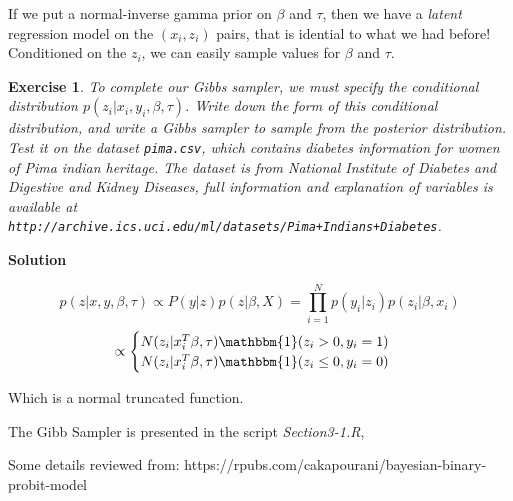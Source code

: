 \documentclass[twoside]{article}
\newcounter{lecnum}
\newtheorem{exercise}{Exercise}[lecnum]
\begin{document}
If we put a normal-inverse gamma prior on $\beta$ and $\tau$, then we have a \textit{latent} regression model on the $(x_i,z_i)$ pairs, that is idential to what we had before! Conditioned on the $z_i$, we can easily sample values for $\beta$ and $\tau$.

\begin{exercise}
  To complete our Gibbs sampler, we must specify the conditional distribution $p(z_i|x_i,y_i,\beta, \tau)$. Write down the form of this conditional distribution, and write a Gibbs sampler to sample from the posterior distribution. Test it on the dataset \texttt{pima.csv}, which contains diabetes information for women of Pima indian heritage. The dataset is from National Institute of Diabetes and Digestive and Kidney Diseases, full information and explanation of variables is available at\\ \texttt{http://archive.ics.uci.edu/ml/datasets/Pima+Indians+Diabetes}.
\end{exercise}

{\color{blue}
\textbf{Solution}

$$ p(z|x,y,\beta, \tau) \propto P(y|z)p(z|\beta, X) = \prod_{i=1}^{N} p(y_i|z_i)p(z_i|\beta, x_i) $$
$$ \propto
\begin{cases}
	N(z_i|x_i^T\beta, \tau) \mathbbm{1} (z_i>0, y_i=1) & \\
	N(z_i|x_i^T\beta, \tau) \mathbbm{1} (z_i \leq 0 , y_i=0) & \\
\end{cases}
$$

Which is a normal truncated function.

The Gibb Sampler is presented in the script \textit{Section3-1.R}, 

Some details reviewed from: 
https://rpubs.com/cakapourani/bayesian-binary-probit-model }

\color{black}{
	 }
\end{document}
